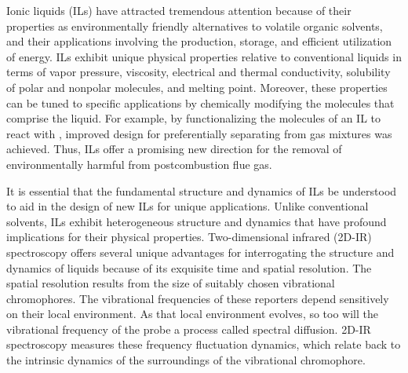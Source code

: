 \documentclass[%
  class = book,%
  crop = false,%
  float = true,%
  multi = true,%
  preview = false,%
]{standalone}
\begin{document}
Ionic liquids (ILs) have attracted tremendous attention because of their properties as environmentally friendly alternatives to volatile organic solvents, and their applications involving the production, storage, and efficient utilization of energy.\cite{Karadas2010,wishartEES-09,Armand2009,Patel2012,baraACR-10} ILs exhibit unique physical properties relative to conventional liquids in terms of vapor pressure, viscosity, electrical and thermal conductivity, solubility of polar and nonpolar molecules, and melting point.\cite{baraACR-10,Crosthwaite2005,seki_effects_2010,Tokuda2005,anthonyJPCB-02} Moreover, these properties can be tuned to specific applications by chemically modifying the molecules that comprise the liquid. For example, by functionalizing the molecules of an IL to react with , improved design for preferentially separating  from gas mixtures was achieved.\cite{anthonyJPCB-02,seoJPCB-14,shiflett_solubilities_2005,Gurkan2010,Cadena2004} Thus, ILs offer a promising new direction for the removal of environmentally harmful  from postcombustion flue gas.

It is essential that the fundamental structure and dynamics of ILs be understood to aid in the design of new ILs for unique applications.  Unlike conventional solvents, ILs exhibit heterogeneous structure and dynamics that have profound implications for their physical properties.  Two-dimensional infrared (2D-IR) spectroscopy offers several unique advantages for interrogating the structure and dynamics of liquids because of its exquisite time and spatial resolution.\cite{Tamimi2016b,Ren2014,hamm_concepts_2011,khalil_coherent_2003} The spatial resolution results from the size of suitably chosen vibrational chromophores. The vibrational frequencies of these reporters depend sensitively on their local environment.\cite{Ren2014,levinson_phosphate_2011,choi_vibrational_2011,choiJCP-08,Lee2011,steinelCPL-04} As that local environment evolves, so too will the vibrational frequency of the probe \textemdash{} a process called spectral diffusion. 2D-IR spectroscopy measures these frequency fluctuation dynamics, which relate back to the intrinsic dynamics of the surroundings of the vibrational chromophore.
\end{document}
